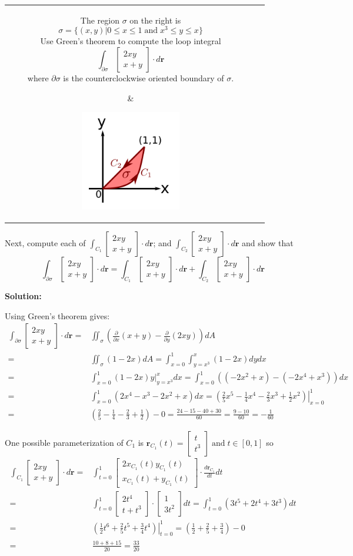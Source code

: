 \documentclass{article}
\newcommand{\colxyvec}[2]{\begin{bmatrix} #1 \\ #2 \end{bmatrix}}
\newcommand{\at}[1]{\left. #1 \right|}
\newcommand{\dr}[1]{\textcolor{dark_red}{#1}}
\begin{document}
\begin{tabular}{cc}
\parbox{0.6\textwidth}{ 
The region \(\sigma\) on the right is 
\[\sigma = \{(x,y) | 0 \leq x \leq 1 \;\text{and}\; x^3 \leq y \leq x\}\]
Use Green's theorem to compute the loop integral
\[\int_{\partial\sigma} \colxyvec{2xy}{x+y} \cdot d\mathbf{r}\]
where \(\partial\sigma\) is the counterclockwise oriented boundary of \(\sigma\).
} & \parbox{0.4\textwidth}{
\includegraphics[width = 0.4\textwidth]{Test_bench_part_4x_images/Test_bench_part_4x_image_2}
}
\end{tabular}
Next, compute each of \(\int_{C_1} \colxyvec{2xy}{x+y} \cdot d\mathbf{r}\); and \(\int_{C_2} \colxyvec{2xy}{x+y} \cdot d\mathbf{r}\) and show that 
\[\int_{\partial\sigma} \colxyvec{2xy}{x+y} \cdot d\mathbf{r} = \int_{C_1} \colxyvec{2xy}{x+y} \cdot d\mathbf{r} + \int_{C_2} \colxyvec{2xy}{x+y} \cdot d\mathbf{r}\]  

\vspace{5mm}
\dr{\textbf{Solution:}}

\dr{Using Green's theorem gives:
\begin{align*} 
\int_{\partial\sigma} \colxyvec{2xy}{x+y} \cdot d\mathbf{r} = & \iint_{\sigma} (\frac{\partial}{\partial x}(x+y) - \frac{\partial}{\partial y}(2xy))dA \\
= & \iint_{\sigma} (1 - 2x)dA 
= \int_{x = 0}^1 \int_{y = x^3}^x (1 - 2x)dydx \\
= & \int_{x = 0}^1 \at{(1 - 2x)y}_{y = x^3}^x dx 
= \int_{x = 0}^1 ((-2x^2 + x) - (-2x^4 + x^3)) dx \\
= & \int_{x = 0}^1 (2x^4 - x^3 - 2x^2 + x) dx 
= \at{(\frac{2}{5}x^5 - \frac{1}{4}x^4 - \frac{2}{3}x^3 + \frac{1}{2}x^2)}_{x = 0}^1 \\
= & (\frac{2}{5} - \frac{1}{4} - \frac{2}{3} + \frac{1}{2}) - 0 
= \frac{24 - 15 - 40 + 30}{60} 
= \frac{9 - 10}{60} 
= -\frac{1}{60}
\end{align*}}  

\dr{One possible parameterization of \(C_1\) is \(\mathbf{r}_{C_1}(t) = \colxyvec{t}{t^3} \;\text{and}\; t \in [0,1]\) so
\begin{align*}
\int_{C_1} \colxyvec{2xy}{x+y} \cdot d\mathbf{r} = & \int_{t=0}^1 \colxyvec{2x_{C_1}(t)y_{C_1}(t)}{x_{C_1}(t)+y_{C_1}(t)} \cdot \frac{d\mathbf{r}_{C_1}}{dt}dt \\
= & \int_{t=0}^1 \colxyvec{2t^4}{t + t^3} \cdot \colxyvec{1}{3t^2}dt 
= \int_{t=0}^1 (3t^5 + 2t^4 + 3t^3)dt \\
= & \at{(\frac{1}{2}t^6 + \frac{2}{5}t^5 + \frac{3}{4}t^4)}_{t=0}^1 
= (\frac{1}{2} + \frac{2}{5} + \frac{3}{4}) - 0 \\
= & \frac{10 + 8 + 15}{20} 
= \frac{33}{20}
\end{align*}}
\end{document}
